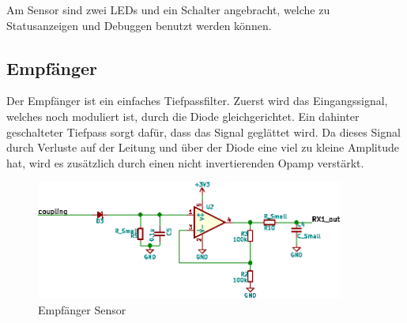 Am Sensor sind zwei LEDs und ein Schalter angebracht, welche zu Statusanzeigen
und Debuggen benutzt werden k\"onnen.

\clearpage
\subsection{Empf\"anger}
\label{subsec:hw:sensor:receiver}

Der   Empf\"anger  ist   ein  einfaches   Tiefpassfilter.   Zuerst   wird  das
Eingangssignal,  welches  noch  moduliert   ist,  durch  die  Diode  
gleichgerichtet. Ein dahinter  geschalteter Tiefpass  sorgt daf\"ur,  dass das
Signal gegl\"attet wird. Da  dieses Signal durch Verluste auf  der Leitung und
\"uber der Diode eine viel zu kleine Amplitude hat, wird es zus\"atzlich durch
einen nicht invertierenden Opamp verst\"arkt.

\begin{figure}[h!t]
    \centering
    \includegraphics[width=0.9\textwidth]{images/sensor-sch/sensor--sch--receiver.eps}
    \caption[Sensor: Schema Empf\"anger]{Empf\"anger Sensor}
\end{figure}

